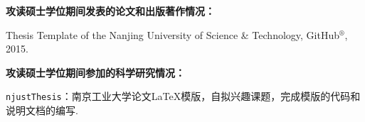 \begin{publications}{99}
\item[] {\bf{攻读硕士学位期间发表的论文和出版著作情况：}}

\item Thesis Template of the Nanjing University of Science \& Technology, GitHub$^{\circledR}$, 2015.

\vspace{1.0cm}
\item[] {\bf{攻读硕士学位期间参加的科学研究情况：}}
\setcounter{enumiv}{0}

\item \texttt{njustThesis}：南京工业大学论文\LaTeX{}模版，自拟兴趣课题，完成模版的代码和说明文档的编写.


\end{publications}
